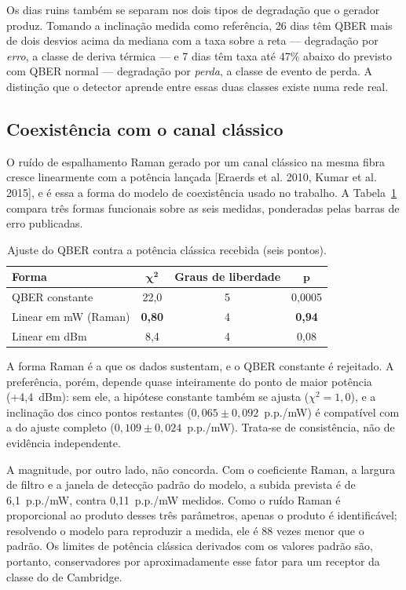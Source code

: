 \documentclass[12pt]{article}
\begin{document}
Os dias ruins também se separam nos dois tipos de degradação que o gerador
produz. Tomando a inclinação medida como referência, 26 dias têm QBER mais de
dois desvios acima da mediana com a taxa sobre a reta --- degradação por
\emph{erro}, a classe de deriva térmica --- e 7 dias têm taxa até 47\% abaixo do
previsto com QBER normal --- degradação por \emph{perda}, a classe de evento de
perda. A distinção que o detector aprende entre essas duas classes existe numa
rede real.

\subsection{Coexistência com o canal clássico}

O ruído de espalhamento Raman gerado por um canal clássico na mesma fibra cresce
linearmente com a potência lançada [Eraerds et al. 2010, Kumar et al. 2015], e é
essa a forma do modelo de coexistência usado no trabalho. A
Tabela~\ref{tab:campo_coex} compara três formas funcionais sobre as seis medidas,
ponderadas pelas barras de erro publicadas.

\begin{table}[htbp]
\centering
\caption{Ajuste do QBER contra a potência clássica recebida (seis pontos).}
\label{tab:campo_coex}
\footnotesize
\begin{tabular}{@{}lccc@{}}
\toprule
\textbf{Forma} & $\boldsymbol{\chi^2}$ & \textbf{Graus de liberdade} & $\boldsymbol{p}$ \\
\midrule
QBER constante & 22,0 & 5 & 0,0005 \\
Linear em mW (Raman) & \textbf{0,80} & 4 & \textbf{0,94} \\
Linear em dBm & 8,4 & 4 & 0,08 \\
\bottomrule
\end{tabular}
\end{table}

A forma Raman é a que os dados sustentam, e o QBER constante é rejeitado. A
preferência, porém, depende quase inteiramente do ponto de maior potência
(+4,4~dBm): sem ele, a hipótese constante também se ajusta ($\chi^2 = 1{,}0$), e a
inclinação dos cinco pontos restantes ($0{,}065 \pm 0{,}092$~p.p./mW) é compatível
com a do ajuste completo ($0{,}109 \pm 0{,}024$~p.p./mW). Trata-se de consistência,
não de evidência independente.

A magnitude, por outro lado, não concorda. Com o coeficiente Raman, a largura de
filtro e a janela de detecção padrão do modelo, a subida prevista é de
6,1~p.p./mW, contra 0,11~p.p./mW medidos. Como o ruído Raman é proporcional ao
produto desses três parâmetros, apenas o produto é identificável; resolvendo o
modelo para reproduzir a medida, ele é 88 vezes menor que o padrão. Os limites de
potência clássica derivados com os valores padrão são, portanto, conservadores
por aproximadamente esse fator para um receptor da classe do de Cambridge.
\end{document}
